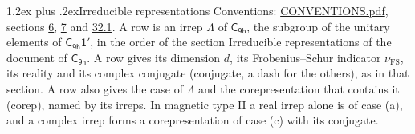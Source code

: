 \documentclass[10pt,a4paper]{article}
\makeatletter
\renewcommand\section{\@startsection{section}{1}{\z@}{-3ex plus -1ex minus -.2ex}%
  {1.2ex plus .2ex}{\normalfont\large\sffamily\bfseries\color{parttitle}}}
\numberwithin{equation}{section}
\newcommand{\grp}[1]{\mathsf{#1}}
\newcommand{\fsind}{\nu_{\mathrm{FS}}}
\makeatother
\begin{document}
\section{Irreducible representations}\label{s:irreps}
Conventions: \href{../../CONVENTIONS.pdf}{CONVENTIONS.pdf}, sections \href{../../../rotation/CONVENTIONS.pdf\#conv.6}{6}, \href{../../../rotation/CONVENTIONS.pdf\#conv.7}{7} and \href{../../CONVENTIONS.pdf\#conv.32.1}{32.1}.
\leavevmode\label{n:irrep.Delta}A row is an irrep $\Lambda$ of $\grp{C_{9h}}$, the subgroup of the unitary elements of $\grp{C_{9h}1'}$, in the order of the section Irreducible representations of the document of \href{../../../rotation/data/pdf/C9h.pdf}{$\grp{C_{9h}}$}. \label{n:index.dimension}\label{n:index.frobenius}\label{n:head.irrep}\label{n:head.reality}\label{n:head.conjugate}A row gives its dimension $d$, its Frobenius--Schur indicator $\fsind$, its reality and its complex conjugate (conjugate, a dash for the others), as in that section. \label{n:head.case.corep}\label{n:head.corep}A row also gives the case of $\Lambda$ and the corepresentation that contains it (corep), named by its irreps. In magnetic type II a real irrep alone is of case (a), and a complex irrep forms a corepresentation of case (c) with its conjugate.
\setlength{\emergencystretch}{2em}\par\setlength{\emergencystretch}{0pt}
\end{document}
